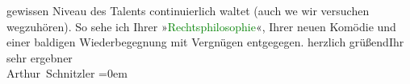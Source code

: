                     gewissen Niveau des Talents continuierlich waltet (auch we{\geminationn} wir versuchen wegzuhören).\pend
           \pstart
           So sehe ich Ihrer »\textcolor{green}{Rechtsphilosophie}{}\ledrightnote{\textcolor{green}{Rechtsphilosophie}}«, Ihrer
                    neuen Komödie und einer baldigen Wiederbegegnung mit Vergnügen entgegegen.\pend
           \pstart
           herzlich grüßend\hspace*{1.5em}Ihr sehr ergebner{\\[\baselineskip]}\spacefill\mbox{Arthur Schnitzler}\pend
           \leftskip=0em{}\endnumbering{}  
      